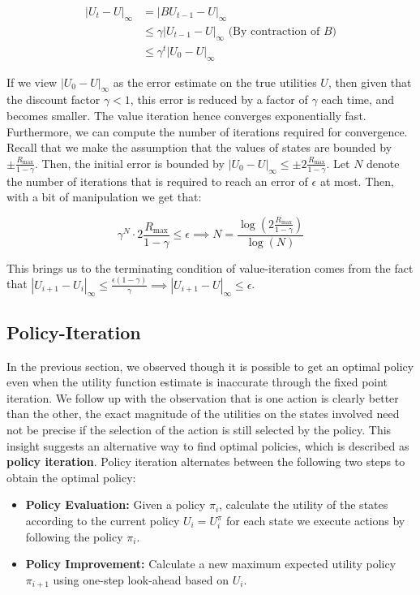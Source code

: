 \documentclass[11pt]{article}
\begin{document}
$$
\begin{aligned}
|U_t - U|_{\infty} &= |BU_{t-1} - U|_{\infty}\\
&\leq \gamma |U_{t-1} - U|_{\infty} \text{ (By contraction of $B$)}\\
&\leq \gamma^t |U_0 - U|_{\infty}
\end{aligned}
$$

If we view $|U_0 - U|_{\infty}$ as the error estimate on the true utilities $U$, then given that the discount factor $\gamma < 1$, this error is reduced by a factor of $\gamma$ each time, and becomes smaller. The value iteration hence converges exponentially fast. Furthermore, we can compute the number of iterations required for convergence. Recall that we make the assumption that the values of states are bounded by $\pm \frac{R_{\max}}{1 - \gamma}$. Then, the initial error is bounded by $|U_0 - U|_{\infty} \leq \pm 2\frac{R_{\max}}{1 - \gamma}$. Let $N$ denote the number of iterations that is required to reach an error of $\epsilon$ at most. Then, with a bit of manipulation we get that:

$$
\gamma^N \cdot 2\frac{R_{\max}}{1 - \gamma} \leq \epsilon \implies N = \frac{\log(2\frac{R_{\max}}{1 - \gamma})}{\log(N)}
$$

This brings us to the terminating condition of value-iteration comes from the fact that $|U_{i+1} - U_i|_{\infty}  \leq \frac{\epsilon (1-\gamma)}{\gamma}\implies |U_{i+1} - U|_{\infty} \leq \epsilon$.

\subsection{Policy-Iteration}

In the previous section, we observed though it is possible to get an optimal policy even when the utility function estimate is inaccurate through the fixed point iteration. We follow up with the observation that is one action is clearly better than the other, the exact magnitude of the utilities on the states involved need not be precise if the selection of the action is still selected by the policy. This insight suggests an alternative way to find optimal policies, which is described as \textbf{policy iteration}. Policy iteration alternates between the following two steps to obtain the optimal policy:

\begin{itemize}
    \item \textbf{Policy Evaluation:} Given a policy $\pi_i$, calculate the utility of the states according to the current policy $U_i = U^{\pi}_i$ for each state we execute actions by following the policy $\pi_i$.
    \item \textbf{Policy Improvement:} Calculate a new maximum expected utility policy $\pi_{i+1}$ using one-step look-ahead based on $U_i$.
\end{itemize}
\end{document}
